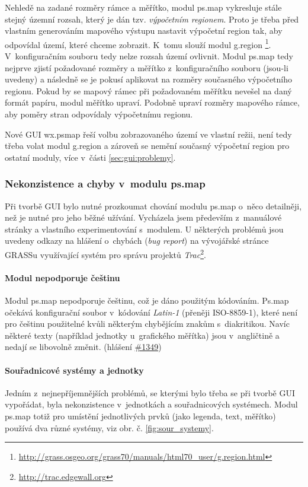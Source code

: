 \documentclass[a4paper,12pt,draft]{article}
\begin{document}
Nehledě na zadané rozměry rámce a měřítko, modul ps.map vykresluje stále stejný
územní rozsah, který je dán tzv. \emph{výpočetním regionem}.
Proto je třeba před vlastním generováním mapového výstupu
nastavit výpočetní region tak, aby odpovídal území, které chceme
zobrazit. K~tomu slouží modul g.region%
\footnote{\url{http://grass.osgeo.org/grass70/manuals/html70_user/g.region.html}}.
 V~konfigu\-račním souboru
tedy nelze rozsah území ovlivnit.
Modul ps.map tedy nejprve zjistí požadované rozměry a měřítko
z~konfiguračního souboru (jsou-li uvedeny) a následně se je pokusí
aplikovat na rozměry současného výpočetního regionu. Pokud by se mapový
rámec při požadovaném měřítku nevešel na daný formát papíru,
modul měřítko upraví. Podobně upraví rozměry mapového rámce, aby
poměry stran odpovídaly výpočetnímu regionu.

Nové GUI wx.psmap řeší volbu zobrazovaného území ve
vlastní režii, není tedy třeba volat modul g.region a zároveň
se nemění současný výpočetní region pro ostatní moduly, více v~části
\ref{sec:gui:problemy}.


\subsubsection{Nekonzistence a chyby v~modulu ps.map}
\label{sec:psmap:chyby}
Při tvorbě GUI bylo nutné prozkoumat chování
modulu ps.map o~něco detailněji, než je nutné pro jeho běžné
užívání. Vycházela jsem především z~manu\-álové stránky \cite{manual}
a vlastního experimentování s~modulem.
U některých problémů jsou uvedeny
odkazy na hlášení o~chybách (\emph{bug report}) na vývojářské stránce
GRASSu \cite{trac} využívající systém pro správu projektů
\emph{Trac}\footnote{\url{http://trac.edgewall.org}}.


\paragraph*{Modul nepodporuje češtinu}
\label{sec:psmap:cestina}
Modul ps.map nepodporuje češtinu, což je dáno použitým
kódováním. Ps.map očekává konfigurační soubor v~kódování
\emph{Latin-1} (pře\-něji ISO-8859-1), které není pro češtinu použitelné
kvůli některým chybějícím zna\-kům s~diakritikou. Navíc některé texty
(například jednotky u~grafického měřítka) jsou v~angličtině a nedají se
libovolně změnit. (hlášení \href{https://trac.osgeo.org/grass/ticket/1349}{%
\#1349})

\paragraph*{Souřadnicové systémy a jednotky}
\label{sec:psmap:sour_systemy}
Jedním z~nejnepříjemnějších problémů, se kterými bylo třeba se při
tvorbě GUI vypořádat, byla nekonzistence v~jednotkách a souřadnicových
systémech. Modul ps.map totiž pro umístění jednotlivých prvků
(jako legenda, text, měřítko) používá dva různé systémy, viz
obr. č. \ref{fig:sour_systemy}.
\end{document}
